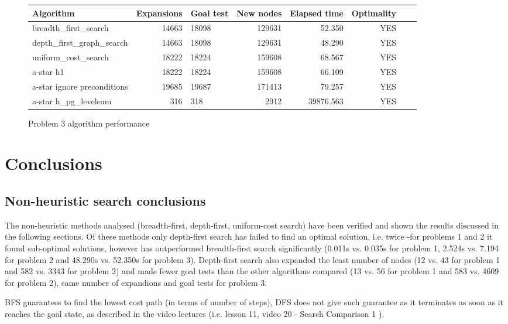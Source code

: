 \documentclass[12pt, a4paper]{article}
\begin{document}
\begin{figure}[htbp]

\begin{tabular}{lrlrrrrl}
\toprule
{} Algorithm &  Expansions &  Goal test &  New nodes &  Elapsed time & Optimality \\
\midrule
breadth\_first\_search &       14663 &      18098 &     129631 &     52.350 &        YES \\
depth\_first\_graph\_search &       14663 &      18098 &     129631 &     48.290 &        YES \\
uniform\_cost\_search &       18222 &      18224 &     159608 &     68.567 &        YES \\
a-star h1 &       18222 &      18224 &     159608 &     66.109 &        YES \\
a-star ignore preconditions &       19685 &      19687 &     171413 &     79.257 &        YES \\
a-star h\_pg\_levelsum &         316 &        318 &       2912 &  39876.563 &        YES \\
\bottomrule
\end{tabular}
\caption{Problem 3 algorithm performance}
\end{figure}


\section{Conclusions}

\subsection{Non-heuristic search conclusions}

The non-heuristic methods analysed (breadth-first, depth-first, uniform-cost search)
have been verified and shown the results discussed in the following sections.
Of these methods only depth-first search has failed to find an optimal solution,
i.e. twice -for problems 1 and 2 it found sub-optimal solutions, however has outperformed
breadth-first search significantly (0.011s vs. 0.035s for problem 1, 2.524s vs. 7.194
for problem 2 and 48.290s vs. 52.350s for problem 3). Depth-first search also expanded the least number of nodes (12 vs. 43 for problem 1 and 582 vs. 3343 for problem 2) and made
fewer goal tests than the other algorithms compared (13 vs. 56 for problem 1 and 583 vs. 4609 for problem 2), same number of expandions and goal tests for problem 3.

BFS guarantees to find the lowest cost path (in terms of number of steps), DFS does not give such guarantee as it terminates as soon as it reaches the goal state, as described in the video lectures (i.e. lesson 11, video 20 - Search Comparison 1
).
\end{document}
